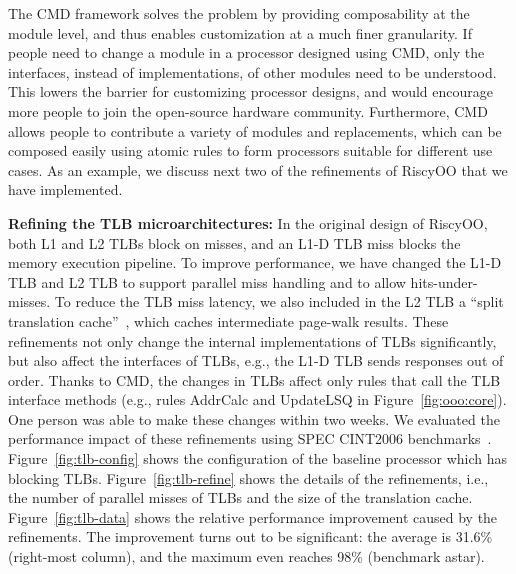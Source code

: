 \documentclass[conference]{IEEEtran}
\begin{document}
The CMD framework solves the problem by providing composability at the module level, and thus enables customization at a much finer granularity.
If people need to change a module in a processor designed using CMD, only the interfaces, instead of implementations, of other modules need to be understood.
This lowers the barrier for customizing processor designs, and would encourage more people to join the open-source hardware community.
Furthermore, CMD allows people to contribute a variety of modules and replacements, which can be composed easily using atomic rules to form processors suitable for different use cases.
As an example, we discuss next two of the refinements of RiscyOO that we have implemented. 

\noindent\textbf{Refining the TLB microarchitectures:}
In the original design of RiscyOO, both L1 and L2 TLBs block on misses, and an L1-D TLB miss blocks the memory execution pipeline.
To improve performance, we have changed the L1-D TLB and L2 TLB to support parallel miss handling and to allow hits-under-misses.
To reduce the TLB miss latency, we also included in the L2 TLB a ``split translation cache''~\cite{translationCache}, which caches intermediate page-walk results.
These refinements not only change the internal implementations of TLBs significantly, but also affect the interfaces of TLBs, e.g., the L1-D TLB sends responses out of order.
Thanks to CMD, the changes in TLBs affect only rules that call the TLB interface methods (e.g., rules AddrCalc and UpdateLSQ in Figure~\ref{fig:ooo:core}). One person was able to make these  changes within two weeks.
We evaluated the performance impact of these refinements using SPEC CINT2006 benchmarks~\cite{riscyoo}.
Figure~\ref{fig:tlb-config} shows the configuration of the baseline processor which has blocking TLBs.
Figure~\ref{fig:tlb-refine} shows the details of the refinements, i.e., the number of parallel misses of TLBs and the size of the translation cache.
Figure~\ref{fig:tlb-data} shows the relative performance improvement caused by the refinements.
The improvement turns out to be significant: the average is 31.6\% (right-most column), and the maximum even reaches 98\% (benchmark astar).

\end{document}
